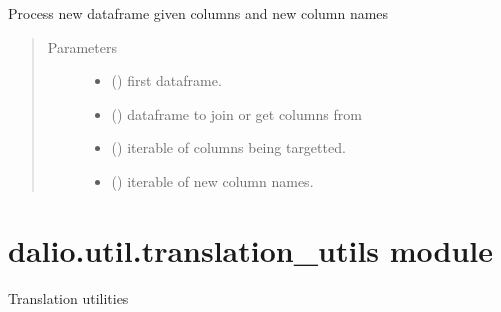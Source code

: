 \documentclass[letterpaper,10pt,english]{sphinxmanual}
\begin{document}

\begin{fulllineitems}
\label{\detokenize{dalio.util:dalio.util.processing_utils.process_new_df}}
Process new dataframe given columns and new column names
\begin{quote}\begin{description}
\item[{Parameters}] \leavevmode\begin{itemize}
\item {} 
 () \textendash{} first dataframe.

\item {} 
 () \textendash{} dataframe to join or get columns from

\item {} 
 () \textendash{} iterable of columns being targetted.

\item {} 
 () \textendash{} iterable of new column names.

\end{itemize}

\end{description}\end{quote}

\end{fulllineitems}



\section{dalio.util.translation\_utils module}
\label{\detokenize{dalio.util:module-dalio.util.translation_utils}}\label{\detokenize{dalio.util:dalio-util-translation-utils-module}}
Translation utilities
\end{document}
